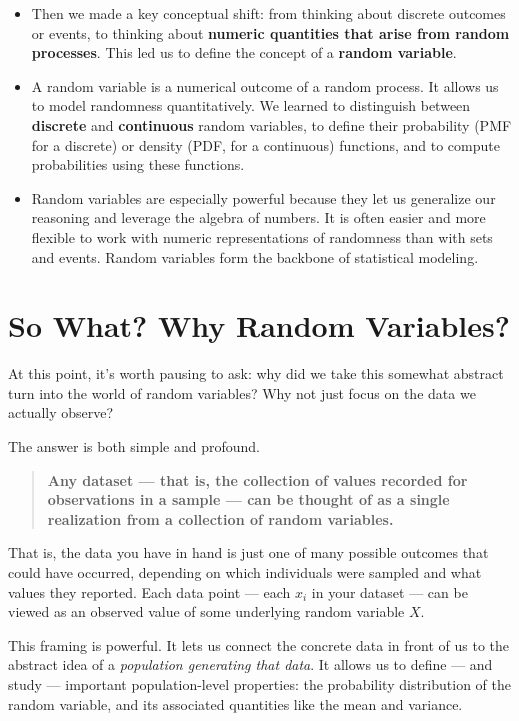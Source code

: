 \documentclass[12pt]{article}
\begin{document}
\begin{itemize}[leftmargin=1.5em]
    \item Then we made a key conceptual shift: from thinking about discrete outcomes or events, to thinking about \textbf{numeric quantities that arise from random processes}. This led us to define the concept of a \textbf{random variable}.
    
    \item A random variable is a numerical outcome of a random process. It allows us to model randomness quantitatively. We learned to distinguish between \textbf{discrete} and \textbf{continuous} random variables, to define their probability (PMF for a discrete) or density (PDF, for a continuous) functions, and to compute probabilities using these functions.
    
    \item Random variables are especially powerful because they let us generalize our reasoning and leverage the algebra of numbers. It is often easier and more flexible to work with numeric representations of randomness than with sets and events. Random variables form the backbone of statistical modeling.
\end{itemize}

\section*{So What? Why Random Variables?}

At this point, it’s worth pausing to ask: why did we take this somewhat abstract turn into the world of random variables? Why not just focus on the data we actually observe?

The answer is both simple and profound.

\begin{quote}
    \textbf{Any dataset — that is, the collection of values recorded for observations in a sample — can be thought of as a single realization from a collection of random variables.}
\end{quote}

That is, the data you have in hand is just one of many possible outcomes that could have occurred, depending on which individuals were sampled and what values they reported. Each data point — each $x_i$ in your dataset — can be viewed as an observed value of some underlying random variable $X$.

This framing is powerful. It lets us connect the concrete data in front of us to the abstract idea of a \emph{population generating that data}. It allows us to define — and study — important population-level properties: the probability distribution of the random variable, and its associated quantities like the mean and variance.
\end{document}
